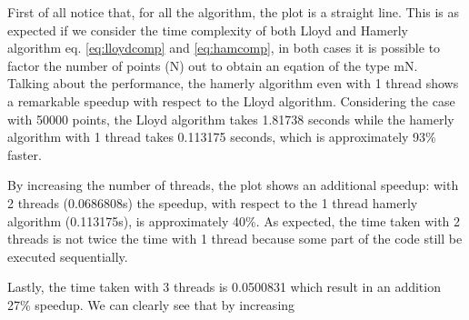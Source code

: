 \documentclass{report}
\begin{document}
\begin{minipage}[b]{0.48\textwidth}
  First of all notice that, for all the algorithm, the plot is a straight line. This is as expected if we consider the time complexity of both Lloyd and Hamerly algorithm eq. \ref{eq:lloydcomp} and \ref{eq:hamcomp}, in both cases it is possible to factor the number of points (N) out to obtain an eqation of the type mN.\\

  Talking about the performance, the hamerly algorithm even with 1 thread shows a remarkable speedup with respect to the Lloyd algorithm. Considering the case with 50000 points, the Lloyd algorithm takes 1.81738 seconds while the hamerly algorithm with 1 thread takes 0.113175 seconds, which is approximately 93\% faster. 
  
  By increasing the number of threads, the plot shows an additional speedup: with 2 threads (0.0686808s) the speedup, with respect to the 1 thread hamerly algorithm (0.113175s), is approximately 40\%. As expected, the time taken with 2 threads is not twice the time with 1 thread because some part of the code still be executed sequentially.

  Lastly, the time taken with 3 threads is 0.0500831 which result in an addition 27\% speedup. We can clearly see that by increasing
\end{minipage}
\hspace{0.1in}
\end{document}
